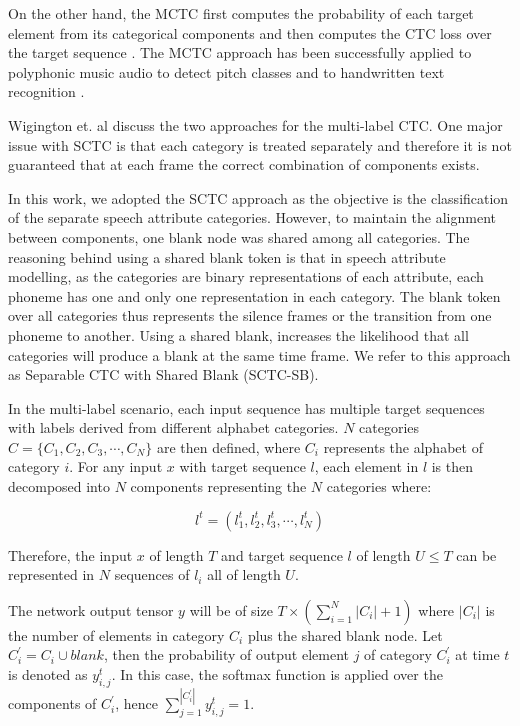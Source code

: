 \documentclass[12pt]{elsarticle}
\begin{document}
On the other hand, the MCTC first computes the probability of each target element from its categorical components and then computes the CTC loss over the target sequence \cite{RN281}. The MCTC approach has been successfully applied to polyphonic music audio to detect pitch classes \cite{RN282} and to handwritten text recognition \cite{RN281}.

Wigington et. al  \cite{RN281} discuss the two approaches for the multi-label CTC. One major issue with SCTC is that each category is treated separately and therefore it is not guaranteed that at each frame the correct combination of components exists.

In this work, we adopted the SCTC approach as the objective is the classification of the separate speech attribute categories. However, to maintain the alignment between components, one blank node was shared among all categories. The reasoning behind using a shared blank token is that in speech attribute modelling, as the categories are binary representations of each attribute, each phoneme has one and only one representation in each category. The blank token over all categories thus represents the silence frames or the transition from one phoneme to another. Using a shared blank, increases the likelihood that all categories will produce a blank at the same time frame. We refer to this approach as Separable CTC with Shared Blank (SCTC-SB).

In the multi-label scenario, each input sequence has multiple target sequences with labels derived from different alphabet categories. $N$ categories $C=\{C_1, C_2, C_3, \cdots, C_N \}$ are then defined, where $C_i$ represents the alphabet of category $i$. For any input $x$ with target sequence $l$, each element in $l$ is then decomposed into $N$ components representing the $N$ categories where:

\begin{equation}
    \label{eq:MCTC1}
    l^t=(l^t_1, l^t_2, l^t_3, \cdots, l^t_N)
\end{equation}

Therefore, the input $x$ of length $T$ and target sequence $l$ of length $U \leq T$ can be represented in $N$ sequences of $l_i$ all of length $U$.

The network output tensor $y$ will be of size $T\times(\sum^N_{i=1}|C_i|+1)$ where $|C_i|$ is the number of elements in category $C_i$ plus the shared blank node. Let $C_i^{'}= C_i\cup{blank}$, then the probability of output element $j$ of category $C_i^{'}$ at time $t$ is denoted as $y_{i,j}^t$. In this case, the softmax function is applied over the components of $C_i^{'}$, hence $\sum_{j=1}^{|C_i^{'}|} y_{i,j}^{t}=1$.
\end{document}
